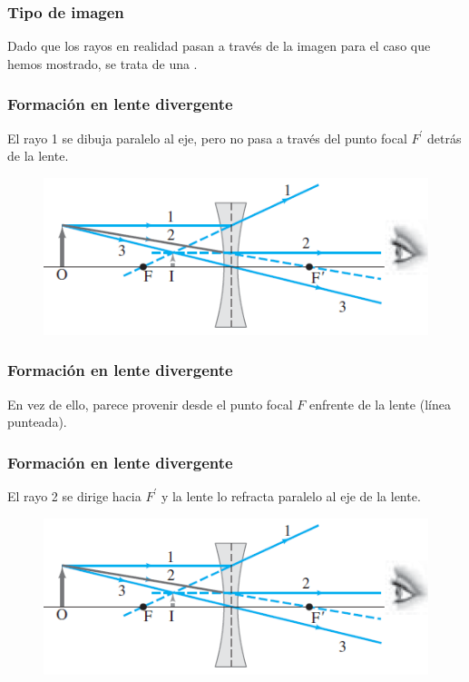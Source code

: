 \documentclass[14pt]{beamer}
\begin{document}
\begin{frame}
\frametitle{Tipo de imagen}
Dado que los rayos en realidad pasan a través de la imagen para el caso que hemos mostrado, \pause se trata de una .
\end{frame}
\begin{frame}
\frametitle{Formación en lente divergente}
\vspace*{-1cm}
El rayo 1 se dibuja paralelo al eje, pero no pasa a través del punto focal $F^{\prime}$ detrás de la lente.
\begin{figure}
    \centering
    \includegraphics[scale=0.8]{Imagenes/Formacion_Imagen_04.png}
\end{figure}
\end{frame}
\begin{frame}
\frametitle{Formación en lente divergente}
En vez de ello, parece provenir desde el punto focal $F$ enfrente de la lente (línea punteada).
\end{frame}
\begin{frame}
\frametitle{Formación en lente divergente}
\vspace*{-1cm}
El rayo 2 se dirige hacia $F^{\prime}$ y la lente lo refracta paralelo al eje de la lente.
\begin{figure}
    \centering
    \includegraphics[scale=0.8]{Imagenes/Formacion_Imagen_04.png}
\end{figure}
\end{frame}
\end{document}
